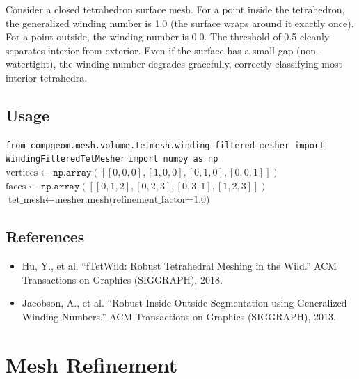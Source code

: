 \begin{example}\label{ex:winding_number}
Consider a closed tetrahedron surface mesh. For a point inside the tetrahedron, the generalized winding number is 1.0 (the surface wraps around it exactly once). For a point outside, the winding number is 0.0. The threshold of 0.5 cleanly separates interior from exterior. Even if the surface has a small gap (non-watertight), the winding number degrades gracefully, correctly classifying most interior tetrahedra.
\end{example}

\subsection{Usage}
\begin{algorithm}
\caption{Winding-Filtered Tet Meshing}
\label{alg:winding_filtered_tet}
\begin{algorithmic}[1]
\State \texttt{from compgeom.mesh.volume.tetmesh.winding\_filtered\_mesher import WindingFilteredTetMesher}
\State \texttt{import numpy as np}
\State
{}
\State $\text{vertices} \gets \texttt{np.array}([[0,0,0], [1,0,0], [0,1,0], [0,0,1]])$
\State $\text{faces} \gets \texttt{np.array}([[0,1,2], [0,2,3], [0,3,1], [1,2,3]])$
\State
\State {}
\State $\text{tet\_mesh} \gets \text{mesher.mesh(refinement\_factor=1.0)}$
\end{algorithmic}
\end{algorithm}

\subsection{References}
\begin{itemize}
\item Hu, Y., et al. ``fTetWild: Robust Tetrahedral Meshing in the Wild.'' ACM Transactions on Graphics (SIGGRAPH), 2018.
\item Jacobson, A., et al. ``Robust Inside-Outside Segmentation using Generalized Winding Numbers.'' ACM Transactions on Graphics (SIGGRAPH), 2013.
\end{itemize}

\section{Mesh Refinement}
\label{sec:mesh_refinement}

